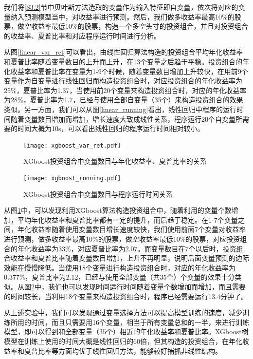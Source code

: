 \documentclass[12pt]{article} %
\begin{document}
	我们将\ref{S3.2}节中贝叶斯方法选取的变量作为输入特征即自变量，依次将对应的变量纳入预测模型当中，对收益率进行预测。然后，我们做多收益率最高10\%的股票，做空收益率最低10\%的股票，构造一个多空头寸的投资组合，并且对投资组合的收益率、夏普比率和对应程序运行时间进行分析。
	
	从图\ref{linear_var_ret}可以看出，由线性回归算法构造的投资组合平均年化收益率和夏普比率随着变量数目的上升而上升，在13个变量之后趋于平稳。投资组合的年化收益率和夏普比率在变量为1-9个时候，随着变量数目增加上升较快，在用前9个变量作为自变量进行线性回归而构造投资组合时，对应投资组合的年化收益率为25\%，夏普比率为1.37，当使用前20个变量来构造投资组合时，对应的年化收益率为28\%，夏普比率为1.7，已经与使用全部自变量（35个）来构造投资组合的效果类似。另一方面，我们可以从图\ref{linear_running}看出，线性回归中程序的运行时间随着变量数目增加而增加，增长速度大致成线性关系，程序运行20个自变量所需要的时间大概为10s，可以看出线性回归的程序运行时间相对较小。
	
	\begin{figure}[ht]
		
		\centering
		\texttt{[image: xgboost\_var\_ret.pdf]}
		\caption{XGboost投资组合中变量数目与年化收益率、夏普比率的关系}
		\label{xgboost_var_ret}
	\end{figure}
	
	\begin{figure}[ht]
		
		\centering
		\texttt{[image: xgboost\_running.pdf]}
		\caption{XGboost投资组合中变量数目与程序运行时间关系}
		\label{xgboost_running}
	\end{figure}
	
	从图\ref{xgboost_var_ret}中，可以发现利用XGboost算法构造投资组合中，随着利用的变量个数增加，平均年化收益率和夏普比率都有一定的提升，而后趋于稳定。在1-7个变量之间，年化收益率随着使用变量数目增长速度较快，我们使用前面7个变量对收益率进行预测，做多收益率最高10\%的股票，做空收益率最低10\%的股票，对应投资组合的年化收益率为33\%，对应夏普比率为2.07。而变量数目在7个以后时，投资组合收益率和夏普比率随着变量数目增加，上升不再明显，说明后面变量预测的边际效能在慢慢降低。当使用18个变量进行构造投资组合时，对应的年化收益率为0.377\%，夏普比率为2.12，已经与使用全部变量（共35个）个变量的效果十分类似。从图\ref{xgboost_running}中，我们也可以发现时间运行时间随着变量个数增加而增加，而且需要的时间较长，当利用18个变量来构造投资组合时，程序已经需要运行13.4分钟了。
	
	从上述实验中，我们可以发现通过变量选择方法可以提高模型训练的速度，减少训练所用的时间，而且只需要用16个变量，相当于所有变量总和的一半，来进行训练模型，即可以得到和全部变量（35个）相近的年化收益率和夏普比率。XGboost树模型在训练上使用的时间大概是线性回归的60倍，但其构造的投资组合，在年化收益率和夏普比率等方面均优于线性回归方法，能够较好捕抓非线性结构。
	
\end{document}
